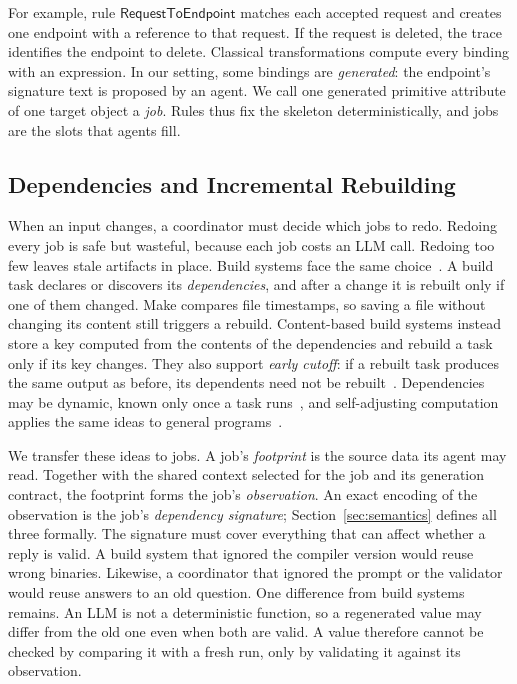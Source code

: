 \documentclass[10pt,journal,compsoc]{IEEEtran}
\theoremstyle{plain}
\theoremstyle{definition}
\begin{document}
For example, rule $\mathsf{RequestToEndpoint}$ matches each accepted request and creates one endpoint with a reference to that request. If the request is deleted, the trace identifies the endpoint to delete. Classical transformations compute every binding with an expression. In our setting, some bindings are \emph{generated}: the endpoint's signature text is proposed by an agent. We call one generated primitive attribute of one target object a \emph{job}. Rules thus fix the skeleton deterministically, and jobs are the slots that agents fill.

\subsection{Dependencies and Incremental Rebuilding}\label{sec:bg-incremental}
When an input changes, a coordinator must decide which jobs to redo. Redoing every job is safe but wasteful, because each job costs an LLM call. Redoing too few leaves stale artifacts in place. Build systems face the same choice~\cite{mokhov}. A build task declares or discovers its \emph{dependencies}, and after a change it is rebuilt only if one of them changed. Make compares file timestamps, so saving a file without changing its content still triggers a rebuild. Content-based build systems instead store a key computed from the contents of the dependencies and rebuild a task only if its key changes. They also support \emph{early cutoff}: if a rebuilt task produces the same output as before, its dependents need not be rebuilt~\cite{mokhov}. Dependencies may be dynamic, known only once a task runs~\cite{erdweg2015pluto}, and self-adjusting computation applies the same ideas to general programs~\cite{acar}.

We transfer these ideas to jobs. A job's \emph{footprint} is the source data its agent may read. Together with the shared context selected for the job and its generation contract, the footprint forms the job's \emph{observation}. An exact encoding of the observation is the job's \emph{dependency signature}; Section~\ref{sec:semantics} defines all three formally. The signature must cover everything that can affect whether a reply is valid. A build system that ignored the compiler version would reuse wrong binaries. Likewise, a coordinator that ignored the prompt or the validator would reuse answers to an old question. One difference from build systems remains. An LLM is not a deterministic function, so a regenerated value may differ from the old one even when both are valid. A value therefore cannot be checked by comparing it with a fresh run, only by validating it against its observation.
\end{document}
